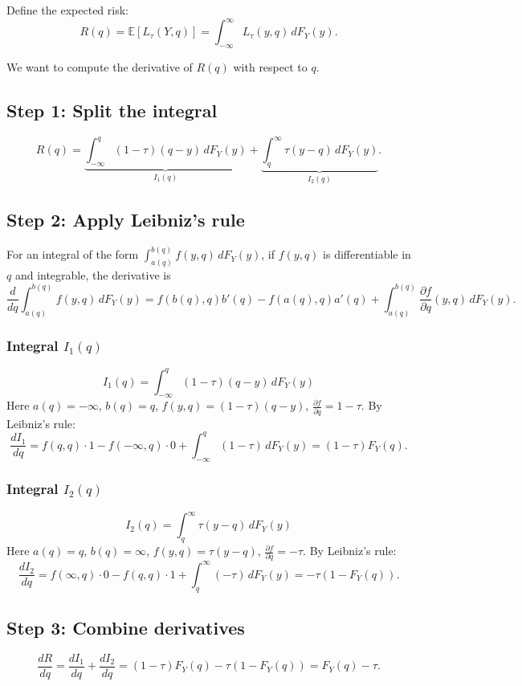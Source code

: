 Define the expected risk:
\[
R(q) = \mathbb{E}[L_\tau(Y,q)] = \int_{-\infty}^{\infty} L_\tau(y,q) \, dF_Y(y).
\]

We want to compute the derivative of $R(q)$ with respect to $q$.

\subsection*{Step 1: Split the integral}
\[
R(q) = \underbrace{\int_{-\infty}^{q} (1-\tau)(q-y) \, dF_Y(y)}_{I_1(q)} + \underbrace{\int_{q}^{\infty} \tau (y-q) \, dF_Y(y)}_{I_2(q)}.
\]

\subsection*{Step 2: Apply Leibniz's rule}
For an integral of the form $\int_{a(q)}^{b(q)} f(y,q) \, dF_Y(y)$, if $f(y,q)$ is differentiable in $q$ and integrable, the derivative is
\[
\frac{d}{dq} \int_{a(q)}^{b(q)} f(y,q) \, dF_Y(y) = f(b(q),q) b'(q) - f(a(q),q) a'(q) + \int_{a(q)}^{b(q)} \frac{\partial f}{\partial q}(y,q) \, dF_Y(y).
\]

\subsubsection*{Integral $I_1(q)$}
\[
I_1(q) = \int_{-\infty}^{q} (1-\tau)(q-y) \, dF_Y(y)
\]
Here $a(q)=-\infty$, $b(q)=q$, $f(y,q) = (1-\tau)(q-y)$, $\frac{\partial f}{\partial q} = 1-\tau$.  
By Leibniz's rule:
\[
\frac{dI_1}{dq} = f(q,q)\cdot 1 - f(-\infty,q)\cdot 0 + \int_{-\infty}^{q} (1-\tau) \, dF_Y(y) = (1-\tau) F_Y(q).
\]

\subsubsection*{Integral $I_2(q)$}
\[
I_2(q) = \int_{q}^{\infty} \tau (y-q) \, dF_Y(y)
\]
Here $a(q)=q$, $b(q)=\infty$, $f(y,q) = \tau(y-q)$, $\frac{\partial f}{\partial q} = -\tau$.  
By Leibniz's rule:
\[
\frac{dI_2}{dq} = f(\infty,q)\cdot 0 - f(q,q)\cdot 1 + \int_{q}^{\infty} (-\tau) \, dF_Y(y) = -\tau (1 - F_Y(q)).
\]

\subsection*{Step 3: Combine derivatives}
\[
\frac{dR}{dq} = \frac{dI_1}{dq} + \frac{dI_2}{dq} = (1-\tau)F_Y(q) - \tau (1 - F_Y(q)) = F_Y(q) - \tau.
\]

